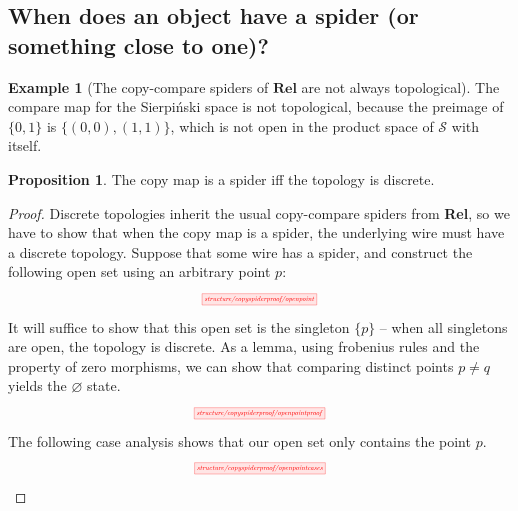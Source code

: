 \documentclass{tufte-handout}
\theoremstyle{definition}
\newtheorem{proposition}[theorem]{Proposition}
\newtheorem{example}[theorem]{Example}
\newtheorem{rem}[theorem]{Reminder}
\begin{document}
\newpage

\subsection{When does an object have a spider (or something close to one)?}


\begin{example}[The copy-compare spiders of $\mathbf{Rel}$ are not always topological]\label{ex:compnotspider}
The compare map for the Sierpi\'{n}ski space is not topological, because the preimage of $\{0,1\}$ is $\{(0,0),(1,1)\}$, which is not open in the product space of $\mathcal{S}$ with itself.
\end{example}

\begin{proposition}\label{prop:copydiscrete}
The copy map is a spider iff the topology is discrete.
\begin{proof}
Discrete topologies inherit the usual copy-compare spiders from \textbf{Rel}, so we have to show that when the copy map is a spider, the underlying wire must have a discrete topology. Suppose that some wire has a spider, and construct the following open set using an arbitrary point $p$:
\[\scalebox{0.5}{\tikzfig{structure/copyspiderproof/openpoint}}\]
It will suffice to show that this open set is the singleton $\{p\}$ -- when all singletons are open, the topology is discrete. As a lemma, using frobenius rules and the property of zero morphisms, we can show that comparing distinct points $p \neq q$ yields the $\varnothing$ state.
\[\scalebox{0.5}{\tikzfig{structure/copyspiderproof/openpointproof}}\]
The following case analysis shows that our open set only contains the point $p$.
\[\scalebox{0.5}{\tikzfig{structure/copyspiderproof/openpointcases}}\]
\end{proof}
\end{proposition}

\end{document}
